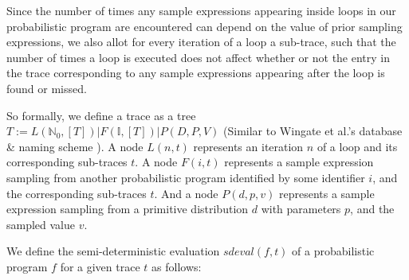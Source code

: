 Since the number of times any sample expressions appearing inside loops in our probabilistic program are encountered can depend on the value of prior sampling expressions, we also allot for every iteration of a loop a sub-trace, such that the number of times a loop is executed does not affect whether or not the entry in the trace corresponding to any sample expressions appearing after the loop is found or missed.

So formally, we define a trace as a tree $T := L(\mathbb{N}_0, [T]) | F(\mathbb{I}, [T]) | P(D,P,V)$ (Similar to Wingate et al.'s database \& naming scheme \cite{wingate2011lightweight}). A node $L(n,t)$ represents an iteration $n$ of a loop and its corresponding sub-traces $t$. A node $F(i, t)$ represents a sample expression sampling from another probabilistic program identified by some identifier $i$, and the corresponding sub-traces $t$. And a node $P(d,p,v)$ represents a sample expression sampling from a primitive distribution $d$ with parameters $p$, and the sampled value $v$.

We define the semi-deterministic evaluation $sdeval(f,t)$ of a probabilistic program $f$ for a given trace $t$ as follows:

